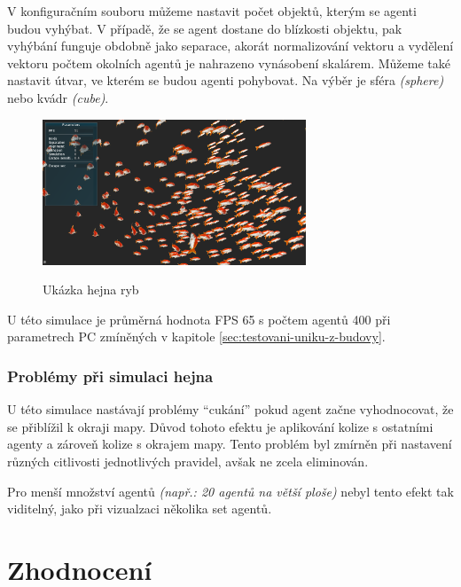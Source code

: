 \documentclass[czech,public,dept460,male,cpdeclaration]{diploma}
\begin{document}
V konfiguračním souboru můžeme nastavit počet objektů, kterým se agenti budou vyhýbat. V případě, že se agent dostane do blízkosti objektu, pak vyhýbání funguje obdobně jako separace, akorát normalizování vektoru a vydělení vektoru počtem okolních agentů je nahrazeno vynásobení skalárem. Můžeme také nastavit útvar, ve kterém se budou agenti pohybovat. Na výběr je sféra \textit{(sphere)} nebo kvádr \textit{(cube)}.

\begin{figure}[H]\centering\includegraphics[width=0.7\textwidth]{Figures/fish4.jpg}\label{fig:fishExample}
	\caption{Ukázka hejna ryb}
	\label{fig:fishExample}
\end{figure}


U této simulace je průměrná hodnota FPS 65 s počtem agentů 400 při parametrech PC zmíněných v kapitole \ref{sec:testovani-uniku-z-budovy}.

\subsubsection{Problémy při simulaci hejna}\label{sec:problemy-pri-simulace-hejna}
U této simulace nastávají problémy ``cukání'' pokud agent začne vyhodnocovat, že se přiblížil k okraji mapy. Důvod tohoto efektu je aplikování kolize s ostatními agenty a zároveň kolize s okrajem mapy. Tento problém byl zmírněn při nastavení různých citlivosti jednotlivých pravidel, avšak ne zcela eliminován.

Pro menší množství agentů \textit{(např.: 20 agentů na větší ploše)} nebyl tento efekt tak viditelný, jako při vizualzaci několika set agentů.

\newpage
\section{Zhodnocení}
\end{document}
